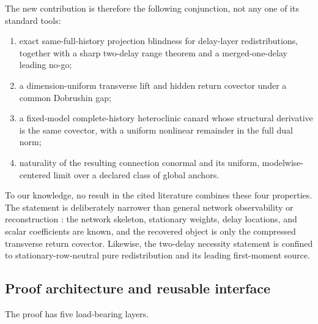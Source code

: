 The new contribution is therefore the following conjunction, not any one of
its standard tools:
\begin{enumerate}[label=\textup{N\arabic*.},leftmargin=3.2em]
\item exact same-full-history projection blindness for delay-layer
redistributions, together with a sharp two-delay range theorem and a
merged-one-delay leading no-go;
\item a dimension-uniform transverse lift and hidden return covector under a
common Dobrushin gap;
\item a fixed-model complete-history heteroclinic canard whose structural
derivative is the same covector, with a uniform nonlinear remainder in the
full dual norm;
\item naturality of the resulting connection conormal and its uniform,
modelwise-centered limit over a declared class of global anchors.
\end{enumerate}
To our knowledge, no result in the cited literature combines these four
properties.  The statement is deliberately narrower than general network
observability or reconstruction
\citep{timme2007revealing,zhang2019reconstruction,pereira2025robust}: the
network skeleton, stationary weights, delay locations, and scalar
coefficients are known, and the recovered object is only the compressed
transverse return covector.  Likewise, the two-delay necessity statement is
confined to stationary-row-neutral pure redistribution and its leading
first-moment source.

\subsection{Proof architecture and reusable interface}

The proof has five load-bearing layers.

